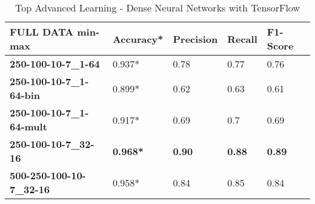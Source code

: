 \documentclass[10pt, conference, compsocconf]{IEEEtran}
\begin{document}
\begin{center}
	\begin{table}[h]
		\centering \footnotesize
		\vspace{0.01cm}
		\caption{Top Advanced Learning - Dense Neural Networks with TensorFlow}
		\hspace{1cm}
		\begin{tabularx}{\linewidth}{ l  X  X  X  X }
			\hline
			\textbf{FULL DATA min-max} &	\textbf{Accuracy*}&	\textbf{Precision}&	\textbf{Recall}&	\textbf{F1-Score} \\ \hline
			
			
			\textbf{250-100-10-7\_1-64}&	0.937*	&0.78&	0.77&	0.76\\ \hline
			\textbf{250-100-10-7\_1-64-bin}&	0.899*&	0.62&	0.63&	0.61\\ \hline
			\textbf{250-100-10-7\_1-64-mult}&	0.917*	&0.69&	0.7&	0.69\\ \hline
			\textbf{250-100-10-7\_32-16}&	\textbf{0.968*}&	\textbf{0.90}&	\textbf{0.88}&	\textbf{0.89}\\ \hline
			\textbf{500-250-100-10-7\_32-16}&	0.958*&	0.84&	0.85&	0.84\\ \hline
			
			
		\end{tabularx}\newline
		\vspace{-0.05cm}
		\label{Table8}
	\end{table} \hfil
\end{center}


%
%
\end{document}
